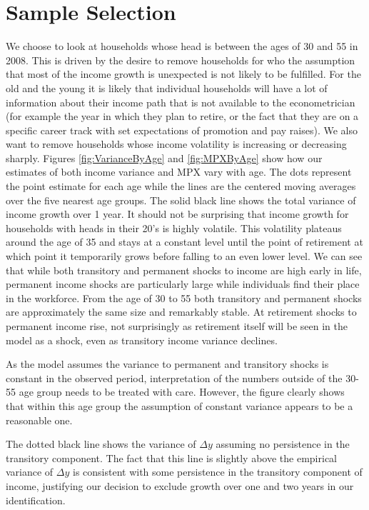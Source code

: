\documentclass[titlepage]{\econtex}\newcommand{\texname}{ConsumptionHeterogeneity}
\begin{document}
\section{Sample Selection} \label{sample_selection}
\setcounter{figure}{0}   
\setcounter{table}{0} 
We choose to look at households whose head is between the ages of 30 and 55 in 2008. This is driven by the desire to remove households for who the assumption that most of the income growth is unexpected is not likely to be fulfilled. For the old and the young it is likely that individual households will have a lot of information about their income path that is not available to the econometrician (for example the year in which they plan to retire, or the fact that they are on a specific career track with set expectations of promotion and pay raises). We also want to remove households whose income volatility is increasing or decreasing sharply. Figures \ref{fig:VarianceByAge} and \ref{fig:MPXByAge} show how our estimates of both income variance and MPX vary with age. The dots represent the point estimate for each age while the lines are the centered moving averages over the five nearest age groups. The solid black line shows the total variance of income growth over 1 year. It should not be surprising that income growth for households with heads in their 20's is highly volatile. This volatility plateaus around the age of 35 and stays at a constant level until the point of retirement at which point it temporarily grows before falling to an even lower level. We can see that while both transitory and permanent shocks to income are high early in life, permanent income shocks are particularly large while individuals find their place in the workforce. From the age of 30 to 55 both transitory and permanent shocks are approximately the same size and remarkably stable. At retirement shocks to permanent income rise, not surprisingly as retirement itself will be seen in the model as a shock, even as transitory income variance declines.

As the model assumes the variance to permanent and transitory shocks is constant in the observed period, interpretation of the numbers outside of the 30-55 age group needs to be treated with care. However, the figure clearly shows that within this age group the assumption of constant variance appears to be a reasonable one.

The dotted black line shows the variance of $\Delta y$ assuming no persistence in the transitory component. The fact that this line is slightly above the empirical variance of $\Delta y$ is consistent with some persistence in the transitory component of income, justifying our decision to exclude growth over one and two years in our identification.
\end{document}
